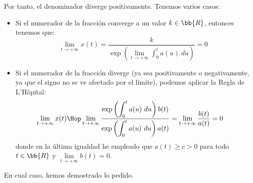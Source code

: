 \begin{ejercicio}
    Por tanto, el denominador diverge positivamente.
    Tenemos varios casos:
    \begin{itemize}
        \item Si el numerador de la fracción converge a un valor $k\in \bb{R}$, entonces tenemos que:
        \begin{equation*}
            \lim_{t\to +\infty} x(t) = \dfrac{k}{\exp\left(\lim\limits_{t\to +\infty}\displaystyle \int_0^t a(u)~du\right)} = 0
        \end{equation*}

        \item Si el numerador de la fracción diverge (ya sea positivamente o negativamente, ya que el signo no se ve afectado por el límite), podemos aplicar la Regla de L'Hôpital:
        \begin{align*}
            \lim_{t\to +\infty} x(t) &\Hop \lim_{t\to +\infty} \dfrac{\exp\left(\displaystyle\int_0^t a(u)~du\right)b(t)}{\exp\left(\displaystyle\int_0^t a(u)~du\right)a(t)} = \lim_{t\to +\infty} \dfrac{b(t)}{a(t)} = 0
        \end{align*}
        donde en la última igualdad he empleado que $a(t)\geq c>0$ para todo $t\in \bb{R}$ y $\lim\limits_{t \to +\infty} b(t) = 0$.
    \end{itemize}
    En cual caso, hemos demostrado lo pedido.
\end{ejercicio}

